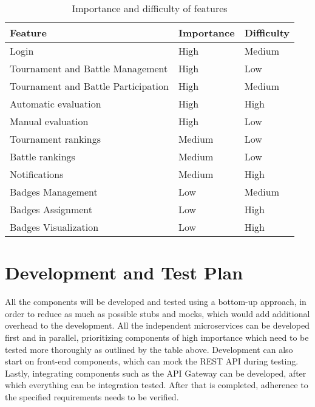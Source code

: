 \begin{table}[H]
    \centering
    \begin{tabular}{|l|l|l|}
        \hline
        \textbf{Feature}                    & \textbf{Importance} & \textbf{Difficulty} \\\hline
        Login                               & High                & Medium              \\
        Tournament and Battle Management    & High                & Low                 \\
        Tournament and Battle Participation & High                & Medium              \\
        Automatic evaluation                & High                & High                \\
        Manual evaluation                   & High                & Low                 \\
        Tournament rankings                 & Medium              & Low                 \\
        Battle rankings                     & Medium              & Low                 \\
        Notifications                       & Medium              & High                \\
        Badges Management                   & Low                 & Medium              \\
        Badges Assignment                   & Low                 & High                \\
        Badges Visualization                & Low                 & High                \\\hline
    \end{tabular}
    \caption{Importance and difficulty of features}
    \label{table:Importance and difficulty of features}
\end{table}

\section{Development and Test Plan}
All the components will be developed and tested using a bottom-up approach, in order to reduce as
much as possible stubs and mocks, which would add additional overhead to the development.
All the independent microservices can be developed first and in parallel, prioritizing components
of high importance which need to be tested more thoroughly as outlined by the table above.
Development can also start on front-end components, which can mock the REST API during testing.
Lastly, integrating components such as the API Gateway can be developed, after which everything
can be integration tested. After that is completed, adherence to the specified requirements
needs to be verified.

